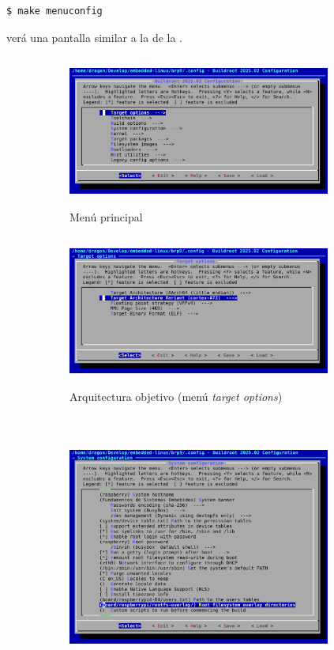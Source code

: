 \begin{Verbatim}[gobble=1]
	$ make menuconfig
\end{Verbatim}

\noindent verá una pantalla similar a la de la .

\begin{figure}[H]
	\centering
	\begin{subfigure}[b]{0.5\textwidth}
		\centering
		\includegraphics[width=0.95\textwidth,height=5cm,keepaspectratio]{img/make-mc-main.png}
		\caption{Menú principal}%
		\label{fig:mc-main}
	\end{subfigure}%
	\begin{subfigure}[b]{0.5\textwidth}
		\centering
		\includegraphics[width=0.95\textwidth,height=5cm,keepaspectratio]{img/make-mc-target.png}
		\caption{Arquitectura objetivo (menú \emph{target options})}%
		\label{fig:mc-target}
	\end{subfigure}\\
	\begin{subfigure}[b]{0.5\textwidth}
		\centering
		\includegraphics[width=0.95\textwidth,height=7cm,keepaspectratio]{img/make-mc-sysconfig.png}

\end{subfigure}
\end{figure}
